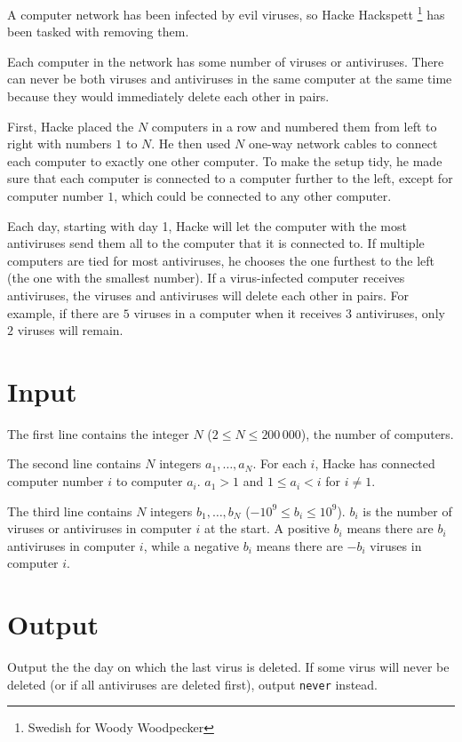 
A computer network has been infected by evil viruses, so Hacke Hackspett \footnote{Swedish for Woody Woodpecker} has been tasked with removing them.

Each computer in the network has some number of viruses or antiviruses. There can never be both viruses and antiviruses in the same computer at the same time because they would immediately delete each other in pairs.

First, Hacke placed the $N$ computers in a row and numbered them from left to right with numbers $1$ to $N$. He then used $N$ one-way network cables to connect each computer to exactly one other computer. To make the setup tidy, he made sure that each computer is connected to a computer further to the left, except for computer number $1$, which could be connected to any other computer.

Each day, starting with day 1, Hacke will let the computer with the most antiviruses send them all to the computer that it is connected to. If multiple computers are tied for most antiviruses, he chooses the one furthest to the left (the one with the smallest number). If a virus-infected computer receives antiviruses, the viruses and antiviruses will delete each other in pairs. For example, if there are $5$ viruses in a computer when it receives $3$ antiviruses, only $2$ viruses will remain.

\section*{Input}
The first line contains the integer $N$ ($2 \leq N \leq 200\,000$), the number of computers.

The second line contains $N$ integers $a_1, \dots, a_N$. For each $i$, Hacke has connected computer number $i$ to computer $a_i$. $a_1 > 1$ and $1 \leq a_i < i$ for $i \neq 1$.

The third line contains $N$ integers $b_1, \dots, b_N$ ($-10^9 \leq b_i \leq 10^9$). $b_i$ is the number of viruses or antiviruses in computer $i$ at the start. A positive $b_i$ means there are $b_i$ antiviruses in computer $i$, while a negative $b_i$ means there are $-b_i$ viruses in computer $i$.

\section*{Output}
Output the the day on which the last virus is deleted. If some virus will never be deleted (or if all antiviruses are deleted first), output \texttt{never} instead.
